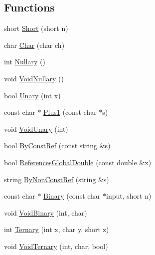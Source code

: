 \subsection*{Functions}
\begin{DoxyCompactItemize}
\item 
short \hyperlink{namespacetesting_1_1gmock__more__actions__test_a00503d3168f1123e314c0d42b7e10b88}{Short} (short n)
\item 
char \hyperlink{namespacetesting_1_1gmock__more__actions__test_af69e6906d734a99d60480e4291891d66}{Char} (char ch)
\item 
int \hyperlink{namespacetesting_1_1gmock__more__actions__test_acdd2dd80f777fdb770b513b63064ac19}{Nullary} ()
\item 
void \hyperlink{namespacetesting_1_1gmock__more__actions__test_a061f6d66383a4e793b4d4ca93bd8ca2f}{Void\+Nullary} ()
\item 
bool \hyperlink{namespacetesting_1_1gmock__more__actions__test_aad456ea2ee1b0cb2741b676a34f540a3}{Unary} (int x)
\item 
const char $\ast$ \hyperlink{namespacetesting_1_1gmock__more__actions__test_a986ada18d3311d3fa3a7c33e54e18f33}{Plus1} (const char $\ast$s)
\item 
void \hyperlink{namespacetesting_1_1gmock__more__actions__test_a163632ef644604032f00334fce36de1a}{Void\+Unary} (int)
\item 
bool \hyperlink{namespacetesting_1_1gmock__more__actions__test_ab175725bcdacf7a00948c7d5c1a36419}{By\+Const\+Ref} (const string \&s)
\item 
bool \hyperlink{namespacetesting_1_1gmock__more__actions__test_ae2d3dddc96f5657127593f129cd3fc51}{References\+Global\+Double} (const double \&x)
\item 
string \hyperlink{namespacetesting_1_1gmock__more__actions__test_ac0099e2d9f40351252df31feda822b71}{By\+Non\+Const\+Ref} (string \&s)
\item 
const char $\ast$ \hyperlink{namespacetesting_1_1gmock__more__actions__test_a853c9f048674a60798b930750b74a1df}{Binary} (const char $\ast$input, short n)
\item 
void \hyperlink{namespacetesting_1_1gmock__more__actions__test_aec71bd163ae67ec97e073bd13a4ac039}{Void\+Binary} (int, char)
\item 
int \hyperlink{namespacetesting_1_1gmock__more__actions__test_ab98b352528a0b72625b4710a6fc648a1}{Ternary} (int x, char y, short z)
\item 
void \hyperlink{namespacetesting_1_1gmock__more__actions__test_ac41b49dc8ab365ccad7b332796421cd4}{Void\+Ternary} (int, char, bool)

\end{DoxyCompactItemize}
